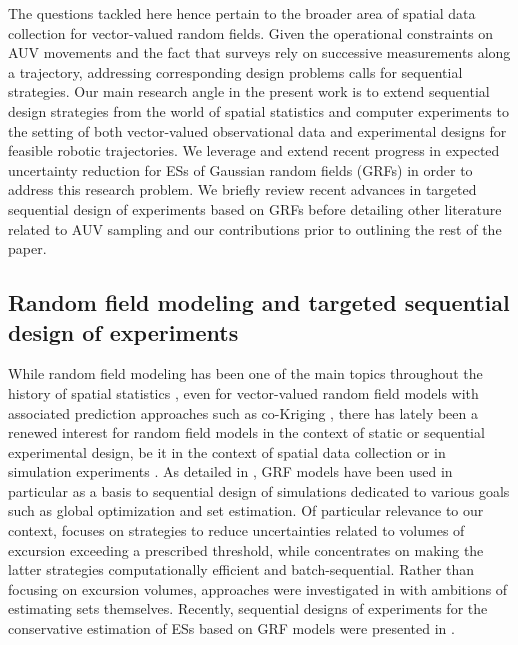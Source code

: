 \documentclass[aoas]{imsart}
\begin{document}
The questions tackled here hence pertain to the broader area of
spatial data collection for vector-valued random fields.
Given the operational constraints on AUV movements and the fact that
surveys rely on successive measurements along a trajectory, addressing
corresponding design problems calls for sequential strategies.  Our
main research angle in the present work is to extend sequential design
strategies from the world of spatial statistics and computer
experiments to the setting of both vector-valued observational data
and experimental designs for feasible robotic trajectories. We
leverage and extend recent progress in expected uncertainty reduction
for ESs of Gaussian random fields (GRFs) in order to address this
research
problem. %
We briefly review recent advances in targeted sequential design of
experiments based on GRFs before detailing other literature related to
AUV sampling and our contributions prior to outlining the rest of the
paper.


\subsection{Random field modeling and targeted sequential design of experiments}
  
While random field modeling has been one of the main topics throughout the history of spatial statistics \citep{Krige1951a,Stein1999}, even
for vector-valued random field models with associated prediction
approaches such as co-Kriging \citep[See, e.g.,][]{Wackernagel2003},
there has lately been a renewed interest for random field models in
the context of static or sequential experimental design, be it in the context of spatial data collection \citep{Mueller2007} or in
simulation experiments \citep{Santner.etal2003}. As detailed in
\cite{Ginsbourger2018}, GRF models have been used in particular as a
basis to sequential design of simulations dedicated to various goals
such as global optimization and set estimation. Of particular relevance to our context,
\cite{Bect.etal2012} focuses on strategies to reduce uncertainties related to volumes of excursion exceeding a prescribed threshold, while \cite{chevalier2014fast} concentrates on making the latter strategies computationally efficient and batch-sequential. Rather than focusing on excursion volumes, approaches were investigated in
\cite{French.Sain2013,Chevalier.etal2013b,Bolin.Lindgren2015,Azzimonti.etal2016}
with ambitions of estimating sets themselves. Recently, sequential
designs of experiments for the conservative estimation of ESs based on
GRF models were presented in \citep{Azzimonti.etal}.
\end{document}
